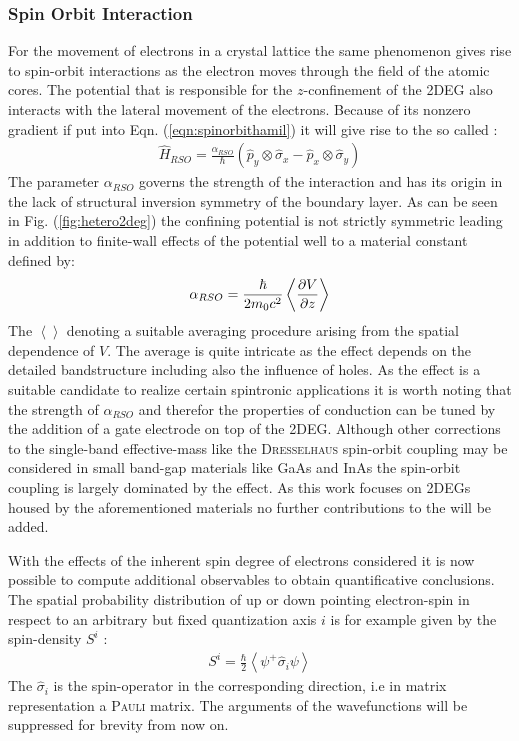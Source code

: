 \subsubsection{Spin Orbit Interaction}
For the movement of electrons in a crystal lattice the same phenomenon gives rise to spin-orbit interactions as the electron moves through the field of the atomic cores.
The potential that is responsible for the $z$-confinement of the 2DEG also interacts with the lateral movement of the electrons. Because of its nonzero gradient if put into Eqn. (\ref{eqn:spinorbithamil}) it will give rise to the so called \rash{} \hamil{}:
\begin{align}
  \hat{H}_{RSO} =\frac{\alpha_{RSO}}{\hbar}(\hat{p}_{y} \otimes \hat{\sigma}_{x} - \hat{p}_{x} \otimes \hat{\sigma}_{y})
	\label{eqn:rashbahamiltonian}
\end{align}
The parameter $\alpha_{RSO}$ governs the strength of the interaction and has its origin in the lack of structural inversion symmetry of the boundary layer.
As can be seen in Fig. (\ref{fig:hetero2deg}) the confining potential is not strictly symmetric leading in addition to finite-wall effects of the potential well to a material constant defined by\cite{Metalidis2007Thesis}:
\begin{align}
\alpha_{RSO} = \frac{\hbar}{2m_0c^2} \left<\frac{\partial V}{\partial z} \right> 
\end{align}
The $\left< \right>$ denoting a suitable averaging procedure arising from the spatial dependence of $V$. The average is quite intricate as the effect depends on the detailed bandstructure including also the influence of holes\cite{JApplPhys.83.4324}.
As the \rash{} effect is a suitable candidate to realize certain spintronic applications it is worth noting that the strength of $\alpha_{RSO}$ and therefor the properties of conduction can be tuned by the addition of a gate electrode on top of the 2DEG\cite{PhysRevLett.78.1335}.
Although other corrections to the single-band effective-mass \hamil{} like the \textsc{Dresselhaus} spin-orbit coupling \cite{PhysRev.100.580} may be considered in small band-gap materials like GaAs and InAs the spin-orbit coupling is largely dominated by the \rash{} effect\cite{PhysRevB.61.15588}. As this work focuses on 2DEGs housed by the aforementioned materials no further contributions to the \hamil{} will be added.\par
With the effects of the inherent spin degree of electrons considered it is now possible to compute additional observables to obtain quantificative conclusions.
The spatial probability distribution of up or down pointing electron-spin in respect to an arbitrary but fixed quantization axis $i$ is for example given by the spin-density $S^i$ \cite{JPhysA:MathGen.18.671}:
\begin{align}
S^i  = \frac{\hbar}{2} \left< \psi^+ \hat{\sigma}_i \psi \right>
\label{eqn:spindensity}
\end{align}
The $\hat{\sigma}_i$ is the spin-operator in the corresponding direction, i.e in matrix representation a \textsc{Pauli} matrix. The arguments of the wavefunctions will be suppressed for brevity from now on.
